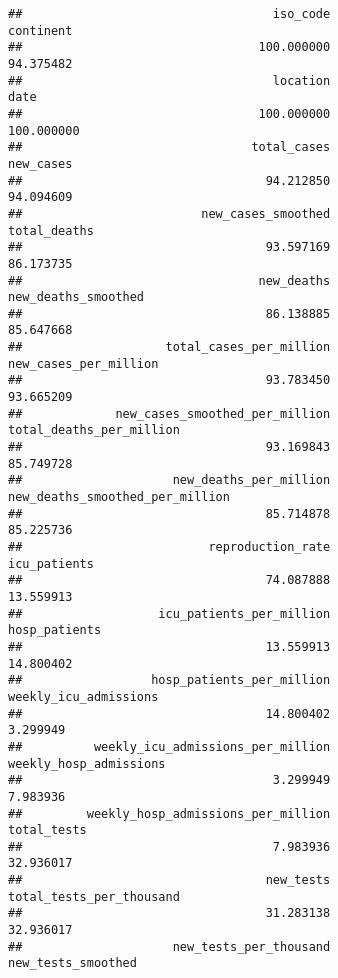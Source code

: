 \documentclass[
]{article}
\begin{document}
\begin{verbatim}
##                                   iso_code                                  continent 
##                                 100.000000                                  94.375482 
##                                   location                                       date 
##                                 100.000000                                 100.000000 
##                                total_cases                                  new_cases 
##                                  94.212850                                  94.094609 
##                         new_cases_smoothed                               total_deaths 
##                                  93.597169                                  86.173735 
##                                 new_deaths                        new_deaths_smoothed 
##                                  86.138885                                  85.647668 
##                    total_cases_per_million                      new_cases_per_million 
##                                  93.783450                                  93.665209 
##             new_cases_smoothed_per_million                   total_deaths_per_million 
##                                  93.169843                                  85.749728 
##                     new_deaths_per_million            new_deaths_smoothed_per_million 
##                                  85.714878                                  85.225736 
##                          reproduction_rate                               icu_patients 
##                                  74.087888                                  13.559913 
##                   icu_patients_per_million                              hosp_patients 
##                                  13.559913                                  14.800402 
##                  hosp_patients_per_million                      weekly_icu_admissions 
##                                  14.800402                                   3.299949 
##          weekly_icu_admissions_per_million                     weekly_hosp_admissions 
##                                   3.299949                                   7.983936 
##         weekly_hosp_admissions_per_million                                total_tests 
##                                   7.983936                                  32.936017 
##                                  new_tests                   total_tests_per_thousand 
##                                  31.283138                                  32.936017 
##                     new_tests_per_thousand                         new_tests_smoothed 

\end{verbatim}
\end{document}
